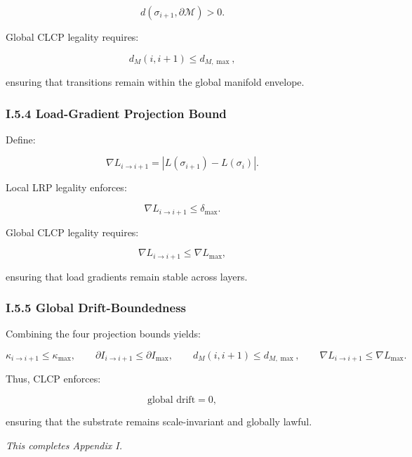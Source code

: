 \[
d(\sigma_{i+1}, \partial\mathcal{M}) > 0.
\]



Global CLCP legality requires:



\[
d_M(i,i+1) \le d_{M,\max},
\]



ensuring that transitions remain within the global manifold envelope.

\subsubsection*{I.5.4 Load-Gradient Projection Bound}

Define:



\[
\nabla L_{i \rightarrow i+1}
    = \left| L(\sigma_{i+1}) - L(\sigma_i) \right|.
\]



Local LRP legality enforces:



\[
\nabla L_{i \rightarrow i+1} \le \delta_{\max}.
\]



Global CLCP legality requires:



\[
\nabla L_{i \rightarrow i+1} \le \nabla L_{\max},
\]



ensuring that load gradients remain stable across layers.

\subsubsection*{I.5.5 Global Drift-Boundedness}

Combining the four projection bounds yields:



\[
\kappa_{i \rightarrow i+1} \le \kappa_{\max}, \qquad
\partial I_{i \rightarrow i+1} \le \partial I_{\max}, \qquad
d_M(i,i+1) \le d_{M,\max}, \qquad
\nabla L_{i \rightarrow i+1} \le \nabla L_{\max}.
\]



Thus, CLCP enforces:



\[
\text{global drift} = 0,
\]



ensuring that the substrate remains scale-invariant and globally lawful.


\medskip

\noindent
\textit{This completes Appendix I.}
